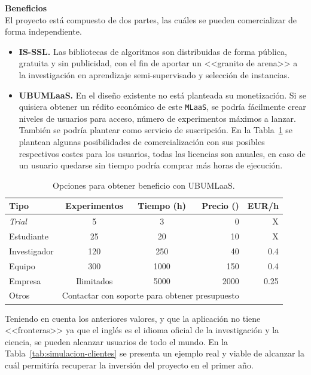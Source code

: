 \textbf{Beneficios}\\
El proyecto está compuesto de dos partes, las cuáles se pueden comercializar de forma independiente.
\begin{itemize}
\item \textbf{IS-SSL.} Las bibliotecas de algoritmos son distribuidas de forma pública, gratuita y sin publicidad, con el fin de aportar un <<granito de arena>> a la investigación en aprendizaje semi-supervisado y selección de instancias.
\item \textbf{UBUMLaaS.} En el diseño existente no está planteada su monetización. Si se quisiera obtener un rédito económico de este \texttt{MLaaS}, se podría fácilmente crear niveles de usuarios para acceso, número de experimentos máximos a lanzar. También se podría plantear como servicio de suscripción. En la Tabla~\ref{tab:opciones-beneficio} se plantean algunas posibilidades de comercialización con sus posibles respectivos costes para los usuarios, todas las licencias son anuales, en caso de un usuario quedarse sin tiempo podría comprar más horas de ejecución.
\end{itemize}

\begin{table}[H]
\centering
\begin{tabular}{lccrr}
	\toprule
	\textbf{Tipo}          &\textbf{Experimentos} & \textbf{Tiempo (h)} & \textbf{Precio (\officialeuro)} &  EUR/h\\
	\midrule
	\textit{Trial}        & 5 & 3 & 0 & X\\
	Estudiante   & 25 & 20 & 10 & X\\
	Investigador  & 120 & 250 & 40 & 0.4 \\
	Equipo  & 300 & 1000 & 150 & 0.4 \\
	Empresa & Ilimitados & 5000 & 2000 & 0.25 \\
	Otros & \multicolumn{3}{c}{Contactar con soporte para obtener presupuesto} \\
	\bottomrule
\end{tabular}
\caption{Opciones para obtener beneficio con UBUMLaaS.}\label{tab:opciones-beneficio}
\end{table}

Teniendo en cuenta los anteriores valores, y que la aplicación no tiene <<fronteras>> ya que el inglés es el idioma oficial de la investigación y la ciencia, se pueden alcanzar usuarios de todo el mundo. En la Tabla~\ref{tab:simulacion-clientes} se presenta un ejemplo real y viable de alcanzar la cuál permitiría recuperar la inversión del proyecto en el primer año.

